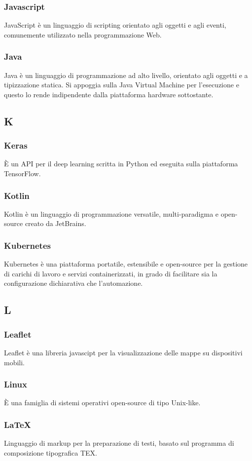 \subsubsection*{Javascript} JavaScript è un linguaggio di scripting orientato agli oggetti e agli eventi, comunemente utilizzato nella programmazione Web.
\subsubsection*{Java} Java è un linguaggio di programmazione ad alto livello, orientato agli oggetti e a tipizzazione statica. Si appoggia sulla Java Virtual Machine per l'esecuzione e questo lo rende indipendente dalla piattaforma hardware sottostante.
\subsection*{K}
\subsubsection*{Keras} È un API per il deep learning scritta in Python ed eseguita sulla piattaforma TensorFlow.
\subsubsection*{Kotlin} Kotlin è un linguaggio di programmazione versatile, multi-paradigma e open-source creato da JetBrains.
\subsubsection*{Kubernetes} Kubernetes è una piattaforma portatile, estensibile e open-source per la gestione di carichi di lavoro e servizi containerizzati, in grado di facilitare sia la configurazione dichiarativa che l'automazione.
\subsection*{L}
\subsubsection*{Leaflet} Leaflet è una libreria javascipt per la visualizzazione delle mappe su dispositivi mobili.
\subsubsection*{Linux} È una famiglia di sistemi operativi open-source di tipo Unix-like.
\subsubsection*{\LaTeX} Linguaggio di markup per la preparazione di testi, basato sul programma di composizione tipografica TEX.
